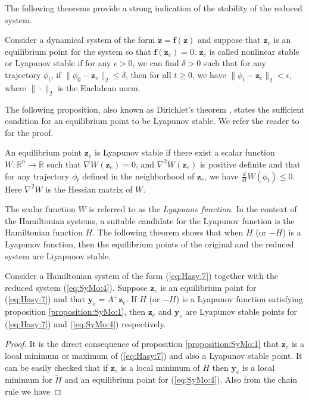 {\edit 
The following theorems provide a strong indication of the stability of the reduced system. 

\begin{definition} \label{definition:SyMo:1}
Consider a dynamical system of the form $\dot{\mathbf z} = \mathbf f(\mathbf z)$ and suppose that $\mathbf z_e$ is an equilibrium point for the system so that $\mathbf f(\mathbf z_e) = 0$. $\mathbf z_e$ is called nonlinear stable or Lyapunov stable if for any $\epsilon > 0$, we can find $\delta > 0$ such that for any trajectory $\phi_t$, if $\| \phi_0 - \mathbf z_e \|_2 \leq \delta$, then for all $t\geq0$, we have $\| \phi_t - \mathbf z_e \|_2 < \epsilon$, where $\| \cdot \|_2$ is the Euclidean norm.
\end{definition}	
The following proposition, also known as Dirichlet's theorem \cite{bhatia2002stability}, states the sufficient condition for an equilibrium point to be Lyapunov stable. We refer the reader to \cite{bhatia2002stability} for the proof.
\begin{proposition} \label{proposition:SyMo:1}
An equilibrium point $\mathbf z_e$ is Lyapunov stable if there exist a scalar function $W : \mathbb R^{n} \to  \mathbb R$ such that $\nabla W(\mathbf z_e) = 0$, and $\nabla^2 W(\mathbf z_e)$ is positive definite and that for any trajectory $\phi_t$ defined in the neighborhood of $\mathbf z_e$, we have $\frac{d}{dt} W(\phi_t) \leq 0$. Here $\nabla^2W$ is the Hessian matrix of $W$.
\end{proposition}
The scalar function $W$ is referred to as the \emph{Lyapunov function}. In the context of the Hamiltonian systems, a suitable candidate for the Lyapunov function is the Hamiltonian function $H$. The following theorem shows that when $H$ (or $-H$) is a Lyapunov function, then the equilibrium points of the original and the reduced system are Liyapunov stable.
\begin{theorem} \label{theorem:SyMo:1}
Consider a Hamiltonian system of the form (\ref{eq:Hasy:7}) together with the reduced system (\ref{eq:SyMo:4}). Suppose $\mathbf z_e$ is an equilibrium point for (\ref{eq:Hasy:7}) and that $\mathbf y_e = A^+\mathbf z_e$. If $H$ (or $-H$) is a Lyapunov function satisfying proposition \ref{proposition:SyMo:1}, then $\mathbf z_e$ and $\mathbf y_e$ are Lyapunov stable points for (\ref{eq:Hasy:7}) and (\ref{eq:SyMo:4}) respectively.
\end{theorem}
\begin{proof}
	It is the direct consequence of proposition \ref{proposition:SyMo:1} that $\mathbf z_e$ is a local minimum or maximum of (\ref{eq:Hasy:7}) and also a Lyapunov stable point. It can be easily checked that if $\mathbf z_e$ is a local minimum of $H$ then $\mathbf y_e$ is a local minimum for $\tilde H$ and an equilibrium point for (\ref{eq:SyMo:4}). Also from the chain rule we have

\end{proof}}
